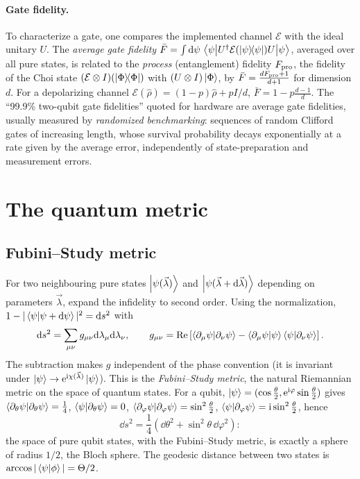 \paragraph{Gate fidelity.} To characterize a gate, one compares the implemented channel $\mathcal E$ with the ideal unitary $U$. The \emph{average gate fidelity} $\bar F=\int\mathrm d\psi\,\left\langle\psi\middle|U^\dagger\mathcal E(\left|\psi\middle\rangle\!\middle\langle\psi\right|)U\middle|\psi\right\rangle$, averaged over all pure states,
is related to the \emph{process} (entanglement) fidelity $F_{\rm pro}$, the fidelity of the Choi state $(\mathcal E\otimes I)(\left|\Phi\middle\rangle\!\middle\langle\Phi\right|)$ with $(U\otimes I)\left|\Phi\right\rangle$, by $\bar F=\frac{dF_{\rm pro}+1}{d+1}$ for dimension $d$. For a depolarizing channel
$\mathcal E(\hat\rho)=(1-p)\hat\rho+pI/d$, $\bar F=1-p\frac{d-1}d$. The ``99.9\% two-qubit gate fidelities'' quoted for hardware are average gate fidelities, usually measured by \emph{randomized benchmarking}: sequences of random Clifford gates of increasing length,
whose survival probability decays exponentially at a rate given by the average error, independently of state-preparation and measurement errors.

\section{The quantum metric}
\subsection{Fubini--Study metric}
For two neighbouring pure states $\left|\psi(\vec\lambda)\right\rangle$ and $\left|\psi(\vec\lambda+\mathrm d\vec\lambda)\right\rangle$ depending on parameters $\vec\lambda$, expand the infidelity to second order. Using the normalization, $1-|\left\langle\psi\middle|\psi+\mathrm d\psi\right\rangle|^2=\mathrm d s^2$ with
\begin{equation}
  \mathrm d s^2=\sum_{\mu\nu}g_{\mu\nu}\mathrm d\lambda_\mu\mathrm d\lambda_\nu,\qquad
  g_{\mu\nu}=\operatorname{Re}\left[\left\langle\partial_\mu\psi\middle|\partial_\nu\psi\right\rangle-\left\langle\partial_\mu\psi\middle|\psi\right\rangle\left\langle\psi\middle|\partial_\nu\psi\right\rangle\right].
\end{equation}
The subtraction makes $g$ independent of the phase convention (it is invariant under $\left|\psi\right\rangle\to\mathrm e^{\mathrm i\chi(\vec\lambda)}\left|\psi\right\rangle$). This is the \emph{Fubini--Study metric}, the natural Riemannian metric on the space of quantum states.
For a qubit, $\left|\psi\right\rangle=(\cos\frac\theta2,\mathrm e^{\mathrm i\varphi}\sin\frac\theta2)$ gives $\left\langle\partial_\theta\psi\middle|\partial_\theta\psi\right\rangle=\frac14$, $\left\langle\psi\middle|\partial_\theta\psi\right\rangle=0$, $\left\langle\partial_\varphi\psi\middle|\partial_\varphi\psi\right\rangle=\sin^2\frac\theta2$,
$\left\langle\psi\middle|\partial_\varphi\psi\right\rangle=\mathrm i\sin^2\frac\theta2$, hence
\begin{equation}
  \dd s^2=\frac14\left(\dd\theta^2+\sin^2\theta\,\dd\varphi^2\right):
\end{equation}
the space of pure qubit states, with the Fubini--Study metric, is exactly a sphere of radius $1/2$, the Bloch sphere. The geodesic distance between two states is $\arccos|\left\langle\psi\middle|\phi\right\rangle|=\Theta/2$.

